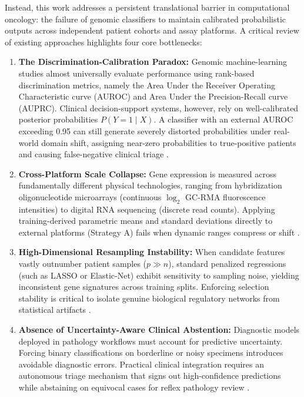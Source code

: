 \documentclass[11pt,a4paper]{article}
\begin{document}
Instead, this work addresses a persistent translational barrier in computational oncology: the failure of genomic classifiers to maintain calibrated probabilistic outputs across independent patient cohorts and assay platforms. A critical review of existing approaches highlights four core bottlenecks:

\begin{enumerate}
    \item \textbf{The Discrimination-Calibration Paradox:} Genomic machine-learning studies almost universally evaluate performance using rank-based discrimination metrics, namely the Area Under the Receiver Operating Characteristic curve (AUROC) and Area Under the Precision-Recall curve (AUPRC). Clinical decision-support systems, however, rely on well-calibrated posterior probabilities $P(Y=1 \mid X)$. A classifier with an external AUROC exceeding 0.95 can still generate severely distorted probabilities under real-world domain shift, assigning near-zero probabilities to true-positive patients and causing false-negative clinical triage \cite{r9,r10}.
    \item \textbf{Cross-Platform Scale Collapse:} Gene expression is measured across fundamentally different physical technologies, ranging from hybridization oligonucleotide microarrays (continuous $\log_2$ GC-RMA fluorescence intensities) to digital RNA sequencing (discrete read counts). Applying training-derived parametric means and standard deviations directly to external platforms (Strategy A) fails when dynamic ranges compress or shift \cite{r11}.
    \item \textbf{High-Dimensional Resampling Instability:} When candidate features vastly outnumber patient samples ($p \gg n$), standard penalized regressions (such as LASSO or Elastic-Net) exhibit sensitivity to sampling noise, yielding inconsistent gene signatures across training splits. Enforcing selection stability is critical to isolate genuine biological regulatory networks from statistical artifacts \cite{r12}.
    \item \textbf{Absence of Uncertainty-Aware Clinical Abstention:} Diagnostic models deployed in pathology workflows must account for predictive uncertainty. Forcing binary classifications on borderline or noisy specimens introduces avoidable diagnostic errors. Practical clinical integration requires an autonomous triage mechanism that signs out high-confidence predictions while abstaining on equivocal cases for reflex pathology review \cite{r13}.
\end{enumerate}
\end{document}
